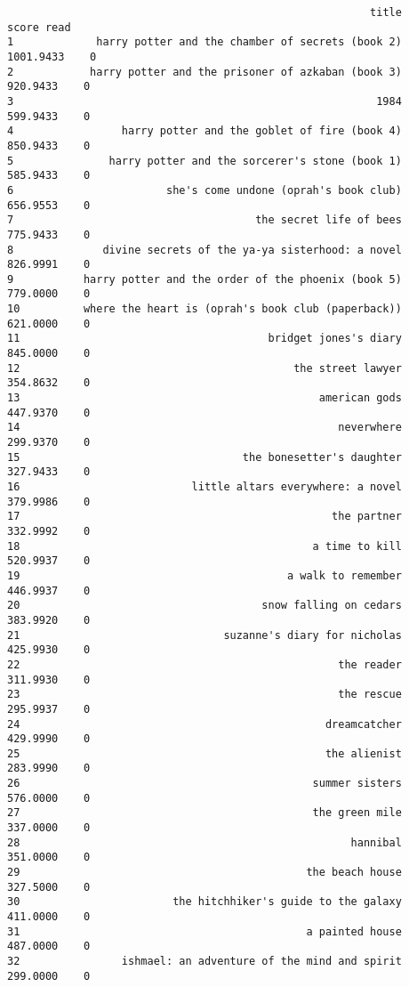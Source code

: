\documentclass[
]{report}
\begin{document}
\begin{verbatim}
                                                         title     score read
1             harry potter and the chamber of secrets (book 2) 1001.9433    0
2            harry potter and the prisoner of azkaban (book 3)  920.9433    0
3                                                         1984  599.9433    0
4                 harry potter and the goblet of fire (book 4)  850.9433    0
5               harry potter and the sorcerer's stone (book 1)  585.9433    0
6                        she's come undone (oprah's book club)  656.9553    0
7                                      the secret life of bees  775.9433    0
8              divine secrets of the ya-ya sisterhood: a novel  826.9991    0
9           harry potter and the order of the phoenix (book 5)  779.0000    0
10          where the heart is (oprah's book club (paperback))  621.0000    0
11                                       bridget jones's diary  845.0000    0
12                                           the street lawyer  354.8632    0
13                                               american gods  447.9370    0
14                                                  neverwhere  299.9370    0
15                                   the bonesetter's daughter  327.9433    0
16                           little altars everywhere: a novel  379.9986    0
17                                                 the partner  332.9992    0
18                                              a time to kill  520.9937    0
19                                          a walk to remember  446.9937    0
20                                      snow falling on cedars  383.9920    0
21                                suzanne's diary for nicholas  425.9930    0
22                                                  the reader  311.9930    0
23                                                  the rescue  295.9937    0
24                                                dreamcatcher  429.9990    0
25                                                the alienist  283.9990    0
26                                              summer sisters  576.0000    0
27                                              the green mile  337.0000    0
28                                                    hannibal  351.0000    0
29                                             the beach house  327.5000    0
30                        the hitchhiker's guide to the galaxy  411.0000    0
31                                             a painted house  487.0000    0
32                ishmael: an adventure of the mind and spirit  299.0000    0

\end{verbatim}
\end{document}

